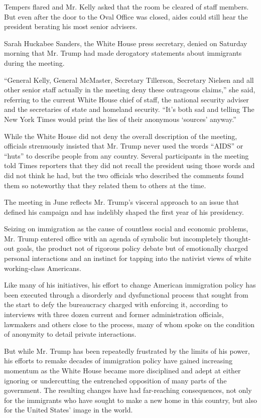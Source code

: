 Tempers flared and Mr. Kelly asked that the room be cleared of staff
members. But even after the door to the Oval Office was closed, aides
could still hear the president berating his most senior advisers.

Sarah Huckabee Sanders, the White House press secretary, denied on
Saturday morning that Mr. Trump had made derogatory statements about
immigrants during the meeting.

``General Kelly, General McMaster, Secretary Tillerson, Secretary
Nielsen and all other senior staff actually in the meeting deny these
outrageous claims,'' she said, referring to the current White House
chief of staff, the national security adviser and the secretaries of
state and homeland security. ``It's both sad and telling The New York
Times would print the lies of their anonymous `sources' anyway.''

While the White House did not deny the overall description of the
meeting, officials strenuously insisted that Mr. Trump never used the
words ``AIDS'' or ``huts'' to describe people from any country. Several
participants in the meeting told Times reporters that they did not
recall the president using those words and did not think he had, but the
two officials who described the comments found them so noteworthy that
they related them to others at the time.

The meeting in June reflects Mr. Trump's visceral approach to an issue
that defined his campaign and has indelibly shaped the first year of his
presidency.

Seizing on immigration as the cause of countless social and economic
problems, Mr. Trump entered office with an agenda of symbolic but
incompletely thought-out goals, the product not of rigorous policy
debate but of emotionally charged personal interactions and an instinct
for tapping into the nativist views of white working-class Americans.

Like many of his initiatives, his effort to change American immigration
policy has been executed through a disorderly and dysfunctional process
that sought from the start to defy the bureaucracy charged with
enforcing it, according to interviews with three dozen current and
former administration officials, lawmakers and others close to the
process, many of whom spoke on the condition of anonymity to detail
private interactions.

But while Mr. Trump has been repeatedly frustrated by the limits of his
power, his efforts to remake decades of immigration policy have gained
increasing momentum as the White House became more disciplined and adept
at either ignoring or undercutting the entrenched opposition of many
parts of the government. The resulting changes have had far-reaching
consequences, not only for the immigrants who have sought to make a new
home in this country, but also for the United States' image in the
world.

